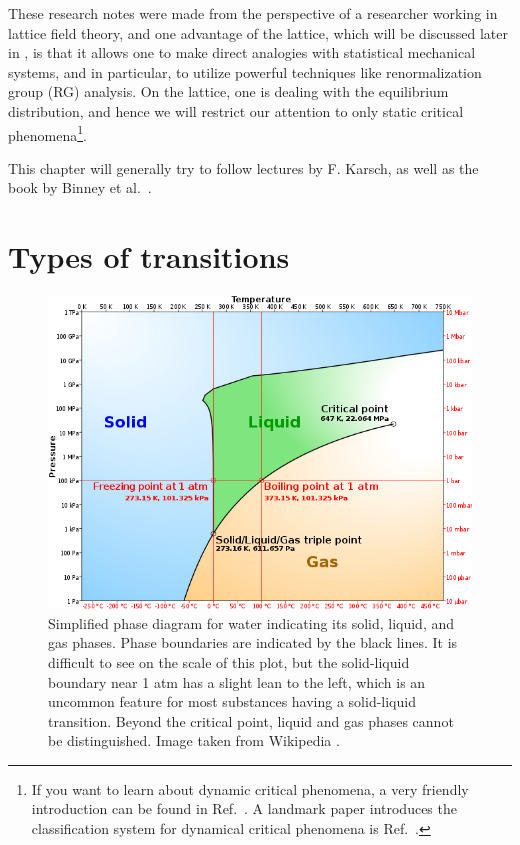 These research notes were made from the perspective of a researcher working
in lattice field theory, and one advantage of the lattice, which will be
discussed later in , is that it allows one
to make direct analogies with statistical mechanical systems, and in
particular, to utilize powerful techniques like renormalization group (RG)
analysis. On the lattice, one is dealing with the equilibrium distribution,
and hence we will restrict our attention to only static critical 
phenomena\footnote{If you want to learn about dynamic critical phenomena, a very
friendly introduction can be found in Ref.~\cite{halperin_theory_2019}.
A landmark paper introduces the classification system for dynamical
critical phenomena is Ref.~\cite{hohenberg_theory_1977}.}.

This chapter will generally try to follow 
lectures by F. Karsch, as well as the book by Binney et
al.~\cite{binney_theory_1992}. 

\section{Types of transitions}

\begin{figure}
\centering
\includegraphics[width=\linewidth]{figs/simplified_water.png}
\caption{Simplified phase diagram for water indicating its solid, liquid, and
gas phases. Phase boundaries are indicated by the black lines. It is difficult
to see on the scale of this plot, but the solid-liquid boundary near 1 atm has a
slight lean to the left, which is an uncommon feature for most substances having
a solid-liquid transition. Beyond the
critical point, liquid and gas phases cannot be distinguished. 
Image taken from Wikipedia \cite{Wiki_water}.}
\label{fig:phase_water}
\end{figure}

